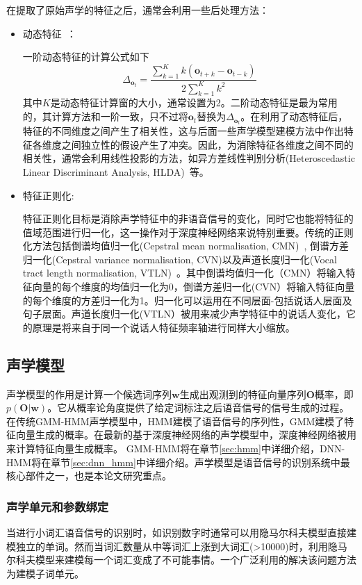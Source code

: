 在提取了原始声学的特征之后，通常会利用一些后处理方法：
\begin{itemize}
    \item 动态特征~\cite{furui1986speaker}：

    一阶动态特征的计算公式如下
    \begin{equation}
        \Delta_{\mathbf{o}_t}=\frac{\sum_{k=1}^K k(\mathbf{o}_{t+k}-\mathbf{o}_{t-k})}{2\sum_{k=1}^K{k^2}}
    \end{equation}
    其中$K$是动态特征计算窗的大小，通常设置为2。二阶动态特征是最为常用的，其计算方法和一阶一致，只不过将$\mathbf{o}_t$替换为$\Delta_{\mathbf{o}_t}$。在利用了动态特征后，特征的不同维度之间产生了相关性，这与后面一些声学模型建模方法中作出特征各维度之间独立性的假设产生了冲突。因此，为消除特征各维度之间不同的相关性，通常会利用线性投影的方法，如异方差线性判别分析(Heteroscedastic Linear Discriminant Analysis, HLDA)~\cite{kumar1998heteroscedastic}等。
    \item 特征正则化:

    特征正则化目标是消除声学特征中的非语音信号的变化，同时它也能将特征的值域范围进行归一化，这一操作对于深度神经网络来说特别重要。传统的正则化方法包括倒谱均值归一化(Cepstral mean normalisation, CMN)~\cite{atal1974effectiveness}, 倒谱方差归一化(Cepstral variance normalisation, CVN)\cite{woodland1995development}以及声道长度归一化(Vocal tract length normalisation, VTLN)~\cite{lee1996speaker}。其中倒谱均值归一化（CMN）将输入特征向量的每个维度的均值归一化为0，倒谱方差归一化(CVN）将输入特征向量的每个维度的方差归一化为1。归一化可以运用在不同层面-包括说话人层面及句子层面。声道长度归一化(VTLN）被用来减少声学特征中的说话人变化，它的原理是将来自于同一个说话人特征频率轴进行同样大小缩放。
\end{itemize}

\subsection{声学模型}
声学模型的作用是计算一个候选词序列$\mathbf{w}$生成出观测到的特征向量序列$\mathbf{O}$概率，即$p(\mathbf{O}|\mathbf{w})$。它从概率论角度提供了给定词标注之后语音信号的信号生成的过程。在传统GMM-HMM声学模型中，HMM建模了语音信号的序列性，GMM建模了特征向量生成的概率。在最新的基于深度神经网络的声学模型中，深度神经网络被用来计算特征向量生成概率。 GMM-HMM将在章节\ref{sec:hmm}中详细介绍，DNN-HMM将在章节\ref{sec:dnn_hmm}中详细介绍。声学模型是语音信号的识别系统中最核心部件之一，也是本论文研究重点。


\subsubsection{声学单元和参数绑定}
当进行小词汇语音信号的识别时，如识别数字时通常可以用隐马尔科夫模型直接建模独立的单词。然而当词汇数量从中等词汇上涨到大词汇(>10000)时，利用隐马尔科夫模型来建模每一个词汇变成了不可能事情。一个广泛利用的解决该问题方法为建模子词单元。

